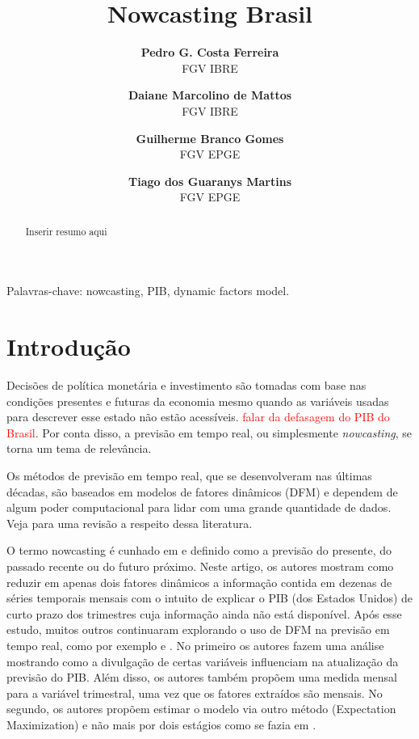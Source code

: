 \documentclass{article}
\title{\textbf{Nowcasting Brasil}}
\author{
\textbf{Pedro G. Costa Ferreira} \\
\small{FGV IBRE}
\and
\textbf{Daiane Marcolino de Mattos}\\
\small{FGV IBRE}
\and
\textbf{Guilherme Branco Gomes}\\
\small{FGV EPGE}
\and
\textbf{Tiago dos Guaranys Martins}\\
\small{FGV EPGE}
}
\date{}
\begin{document}


\maketitle %

\begin{abstract}
Inserir resumo aqui
\end{abstract}

Palavras-chave: nowcasting, PIB, dynamic factors model.

{\let\thefootnote\relax{}}


\section{Introdução}\label{intro}

Decisões de política monetária e investimento são tomadas com base nas condições presentes e futuras da economia mesmo quando as variáveis usadas para descrever esse estado não estão acessíveis. \textcolor{red}{falar da defasagem do PIB do Brasil}. Por conta disso, a previsão em tempo real, ou simplesmente \textit{nowcasting}, se torna um tema de relevância. 

Os métodos de previsão em tempo real, que se desenvolveram nas últimas décadas, são baseados em modelos de fatores dinâmicos (DFM) e dependem de algum poder computacional para lidar com uma grande quantidade de dados. Veja \cite{stockwatson2006} para uma revisão a respeito dessa literatura. 
 
O termo nowcasting é cunhado em \cite{giannoneetal2008} e definido como a previsão do presente, do passado recente ou do futuro próximo. Neste artigo, os autores mostram como reduzir em apenas dois fatores dinâmicos a informação contida em dezenas de séries temporais mensais com o intuito de explicar o PIB (dos Estados Unidos) de curto prazo dos trimestres cuja informação ainda não está disponível. Após esse estudo, muitos outros continuaram explorando o uso de DFM na previsão em tempo real, como por exemplo \cite{banburarunstler2011} e \cite{banburaetal2011}. No primeiro os autores fazem uma análise mostrando como a divulgação de certas variáveis influenciam na atualização da previsão do PIB. Além disso, os autores também propõem uma medida mensal para a variável trimestral, uma vez que os fatores extraídos são mensais. No segundo, os autores propõem estimar o modelo via outro método (Expectation Maximization) e não mais por dois estágios como se fazia em \cite{giannoneetal2008}.
\end{document}
